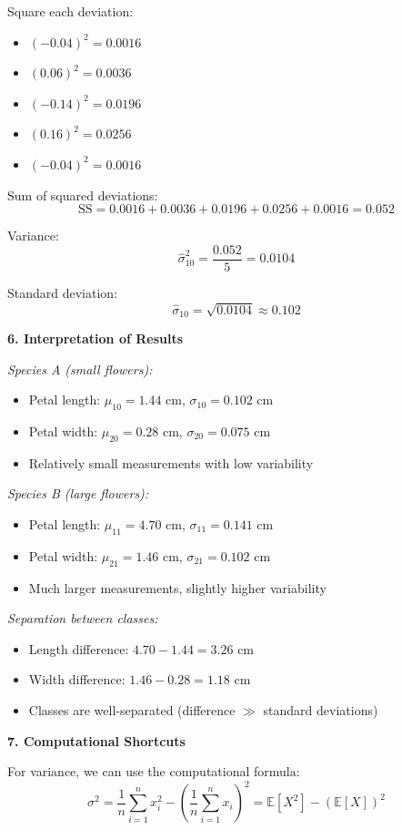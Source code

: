 \documentclass[12pt]{article}
\begin{document}
\begin{explanation}
Square each deviation:
\begin{itemize}
    \item $(-0.04)^2 = 0.0016$
    \item $(0.06)^2 = 0.0036$
    \item $(-0.14)^2 = 0.0196$
    \item $(0.16)^2 = 0.0256$
    \item $(-0.04)^2 = 0.0016$
\end{itemize}

Sum of squared deviations:
\[
\text{SS} = 0.0016 + 0.0036 + 0.0196 + 0.0256 + 0.0016 = 0.052
\]

Variance:
\[
\hat{\sigma}_{10}^2 = \frac{0.052}{5} = 0.0104
\]

Standard deviation:
\[
\hat{\sigma}_{10} = \sqrt{0.0104} \approx 0.102
\]

\textbf{6. Interpretation of Results}

\textit{Species A (small flowers):}
\begin{itemize}
    \item Petal length: $\mu_{10} = 1.44$ cm, $\sigma_{10} = 0.102$ cm
    \item Petal width: $\mu_{20} = 0.28$ cm, $\sigma_{20} = 0.075$ cm
    \item Relatively small measurements with low variability
\end{itemize}

\textit{Species B (large flowers):}
\begin{itemize}
    \item Petal length: $\mu_{11} = 4.70$ cm, $\sigma_{11} = 0.141$ cm
    \item Petal width: $\mu_{21} = 1.46$ cm, $\sigma_{21} = 0.102$ cm
    \item Much larger measurements, slightly higher variability
\end{itemize}

\textit{Separation between classes:}
\begin{itemize}
    \item Length difference: $4.70 - 1.44 = 3.26$ cm
    \item Width difference: $1.46 - 0.28 = 1.18$ cm
    \item Classes are well-separated (difference $\gg$ standard deviations)
\end{itemize}

\textbf{7. Computational Shortcuts}

For variance, we can use the computational formula:
\[
\sigma^2 = \frac{1}{n}\sum_{i=1}^{n} x_i^2 - \left(\frac{1}{n}\sum_{i=1}^{n} x_i\right)^2 = \mathbb{E}[X^2] - (\mathbb{E}[X])^2
\]


\end{explanation}
\end{document}
